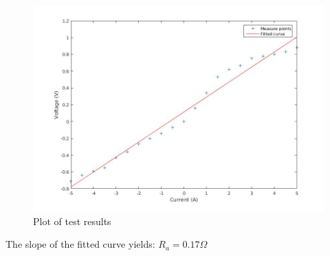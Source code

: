 \begin{figure}[H]
 	\centering
  \includegraphics[scale=.4]{figures/aMotorArmatureResistance}
	\caption{Plot of test results}
\end{figure}

The slope of the fitted curve yields: $R_a = 0.17 \Omega$